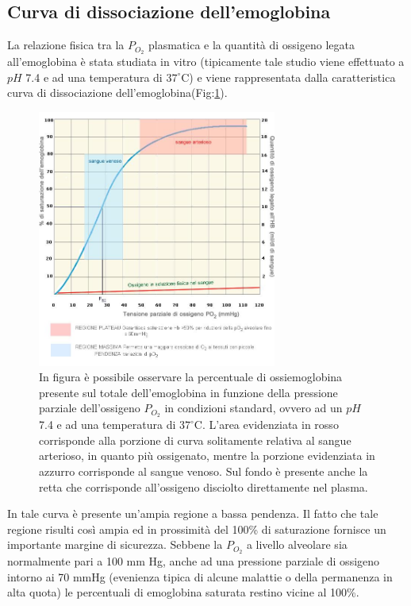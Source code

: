 \documentclass[a4paper, 12pt]{book}
\begin{document}
\subsection{Curva di dissociazione dell'emoglobina}

La relazione fisica tra la $P_{O_2}$ plasmatica e la quantità di ossigeno legata all'emoglobina è stata studiata in vitro (tipicamente tale studio viene effettuato a $pH$ 7.4 e ad una temperatura di $37^\circ$C) e viene rappresentata dalla caratteristica curva di dissociazione dell'emoglobina(Fig:\ref{fig:Dissociation Curve}).
\begin{figure}[h!]
    \centering
    \includegraphics[width=0.7\textwidth]{emoglobina2.jpeg}
    \caption{In figura è possibile osservare la percentuale di ossiemoglobina presente 					 sul totale dell'emoglobina in funzione della pressione parziale 							 dell'ossigeno $P_{O_2}$ in condizioni standard, ovvero ad un $pH$ 7.4 e ad 			 una temperatura di $37^\circ$C.
			 L'area evidenziata in rosso corrisponde alla porzione di curva solitamente 			 relativa al sangue arterioso, in quanto più ossigenato, mentre la porzione 			 evidenziata in azzurro corrisponde al sangue venoso.
			 Sul fondo è presente anche la retta che corrisponde all'ossigeno disciolto 			 direttamente nel plasma.}
    \label{fig:Dissociation Curve}
\end{figure}
In tale curva è presente un'ampia regione a bassa pendenza.
Il fatto che tale regione risulti così ampia ed in prossimità del 100\% di saturazione fornisce un importante margine di sicurezza.
Sebbene la $P_{O_2}$ a livello alveolare sia normalmente pari a 100 mm Hg, anche ad una pressione parziale di ossigeno intorno ai 70 mmHg (evenienza tipica di alcune malattie o della permanenza in alta quota) le percentuali di emoglobina saturata restino vicine al 100\%.
\end{document}
